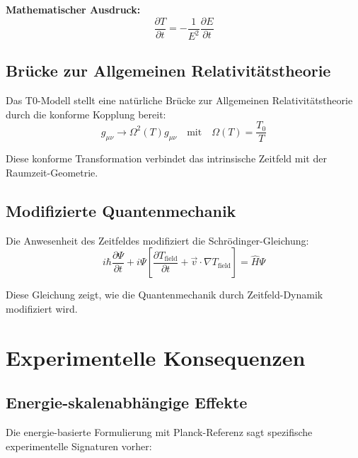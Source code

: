 \documentclass[12pt,a4paper]{report}
\begin{document}
	\textbf{Mathematischer Ausdruck:}
	\begin{equation}
		\frac{\partial T}{\partial t} = -\frac{1}{E^2}\frac{\partial E}{\partial t}
	\end{equation}
	
	\subsection{Brücke zur Allgemeinen Relativitätstheorie}\label{subsec:bridge_general_relativity}
	
	Das T0-Modell stellt eine natürliche Brücke zur Allgemeinen Relativitätstheorie durch die konforme Kopplung bereit:
	\begin{equation}
		g_{\mu\nu} \to \Omega^2(T) g_{\mu\nu} \quad \text{mit} \quad \Omega(T) = \frac{T_0}{T}
		\label{eq:conformal_coupling}
	\end{equation}
	
	Diese konforme Transformation verbindet das intrinsische Zeitfeld mit der Raumzeit-Geometrie.
	
	\subsection{Modifizierte Quantenmechanik}\label{subsec:modified_quantum_mechanics}
	
	Die Anwesenheit des Zeitfeldes modifiziert die Schrödinger-Gleichung:
	\begin{equation}
		i \hbar \frac{\partial\Psi}{\partial t} + i\Psi\left[\frac{\partial T_{\text{field}}}{\partial t} + \vec{v} \cdot \nabla T_{\text{field}}\right] = \hat{H}\Psi
		\label{eq:modified_schrodinger}
	\end{equation}
	
	Diese Gleichung zeigt, wie die Quantenmechanik durch Zeitfeld-Dynamik modifiziert wird.
	
	\section{Experimentelle Konsequenzen}\label{sec:experimental_consequences}
	
	\subsection{Energie-skalenabhängige Effekte}\label{subsec:energy_scale_effects}
	
	Die energie-basierte Formulierung mit Planck-Referenz sagt spezifische experimentelle Signaturen vorher:
	
\end{document}
